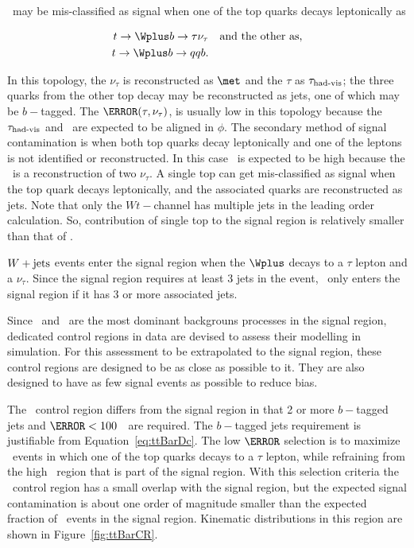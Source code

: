 \par \ttbar\ may be mis-classified as signal  
 when one of the top quarks decays leptonically as 

\begin{equation}
\begin{aligned}
t\to \Wplus b\to\tau\nu_\tau  &  & \text{and the other as,} \\
t\to \Wplus b\to qqb. &  &
\end{aligned}
\label{eq:ttBarDc}
\end{equation}

In this topology, the $\nu_\tau$  is reconstructed as $\met$ and the $\tau$ as $\tau_{\text{had-vis}}$; the three quarks from the other 
top decay may be reconstructed as jets, one of which may be $b-$tagged.  
The $\mT(\tau,\nu_\tau)$, is usually 
low in this topology because the $\tau_{\text{had-vis}}$ and \met\ are expected to be aligned in $\phi$. 
The secondary method of \ttbar signal contamination is when both top quarks decay 
leptonically and one of the leptons is not identified or reconstructed. In this case \mT\ is expected to be 
high because the \met\ is a reconstruction of two $\nu_\tau$.
A single top can get mis-classified as signal when the top quark decays leptonically, and the 
associated quarks are reconstructed as jets. Note that only the $Wt-$channel has multiple jets in the 
leading order calculation. So, contribution of single top to the signal region is relatively smaller than that 
of \ttbar. 

\par $W+\text{jets}$ events enter the signal region when the $\Wplus$ decays to a $\tau$ lepton and a $\nu_\tau$. 
Since the signal region requires at least 3 jets in the event, \Wjets\ only enters the signal 
region if it has 3 or more associated jets.

\par Since \ttbar\ and \Wjets\ are the most dominant backgrouns processes in the signal region, 
dedicated control regions in data are devised to assess their modelling in simulation.   
For this assessment to be extrapolated to the signal region, these control regions 
are designed to be as close as possible to it. They are also designed to have as few signal events 
as possible to reduce bias.
 
\par The \ttbar\ control region differs from the signal region in that 2 or more $b-$tagged jets 
and $\mT<100$~\GeV\ are required. The $b-$tagged jets requirement is justifiable from Equation~\ref{eq:ttBarDc}. 
 The low $\mT$ selection is to maximize \ttbar\ events in which 
one of the top quarks decays to a $\tau$ lepton, while refraining from the high \mT\ region that is 
part of the signal region. With this selection criteria the \ttbar\ control region has a small 
overlap with the signal region, but the expected signal contamination is about one order of 
magnitude smaller than the expected fraction of \cHtaunu\ events in the signal region. Kinematic 
distributions in this region are shown in Figure~\ref{fig:ttBarCR}. 

